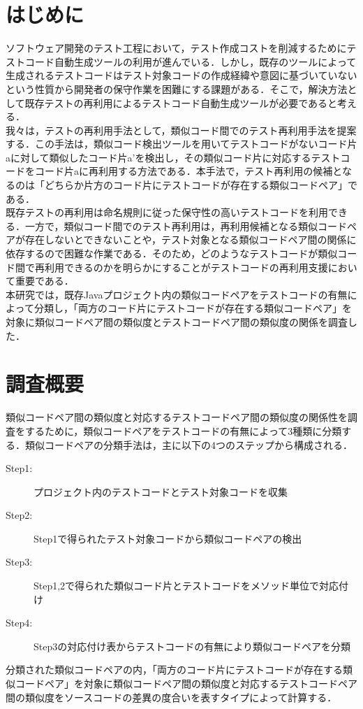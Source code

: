 \documentclass{fose2019}           %
\begin{document}
\section{はじめに}
ソフトウェア開発のテスト工程において，テスト作成コストを削減するためにテストコード自動生成ツールの利用が進んでいる．しかし，既存のツールによって生成されるテストコードはテスト対象コードの作成経緯や意図に基づいていないという性質から開発者の保守作業を困難にする課題がある\cite{ICST}．そこで，解決方法として既存テストの再利用によるテストコード自動生成ツールが必要であると考える．
\\\indent 我々は，テストの再利用手法として，類似コード間でのテスト再利用手法を提案する．この手法は，類似コード検出ツール\cite{ICPC}を用いてテストコードがないコード片aに対して類似したコード片a'を検出し，その類似コード片に対応するテストコードをコード片aに再利用する方法である．本手法で，テスト再利用の候補となるのは「どちらか片方のコード片にテストコードが存在する類似コードペア」である．
\\\indent 既存テストの再利用は命名規則に従った保守性の高いテストコードを利用できる．一方で，類似コード間でのテスト再利用は，再利用候補となる類似コードペアが存在しないとできないことや，テスト対象となる類似コードペア間の関係に依存するので困難な作業である．そのため，どのようなテストコードが類似コード間で再利用できるのかを明らかにすることがテストコードの再利用支援において重要である．
\\\indent 本研究では，既存Javaプロジェクト内の類似コードペアをテストコードの有無によって分類し，「両方のコード片にテストコードが存在する類似コードペア」を対象に類似コードペア間の類似度とテストコードペア間の類似度の関係を調査した．

\section{調査概要}
類似コードペア間の類似度と対応するテストコードペア間の類似度の関係性を調査をするために，類似コードペアをテストコードの有無によって3種類に分類する．類似コードペアの分類手法は，主に以下の4つのステップから構成される．
\begin{description}
\item[Step1:]プロジェクト内のテストコードとテスト対象コードを収集
\item[Step2:]Step1で得られたテスト対象コードから類似コードペアの検出
\item[Step3:]Step1,2で得られた類似コード片とテストコードをメソッド単位で対応付け
\item[Step4:]Step3の対応付け表からテストコードの有無により類似コードペアを分類
\end{description}
\par 分類された類似コードペアの内，「両方のコード片にテストコードが存在する類似コードペア」を対象に類似コードペア間の類似度と対応するテストコードペア間の類似度をソースコードの差異の度合いを表すタイプ\cite{SCP}によって計算する．
\end{document}
